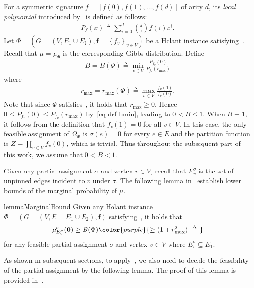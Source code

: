 \documentclass[11pt]{article}
\newcommand{\set}[1]{\left\{#1\right\}}
\newcommand{\defeq}{\triangleq} \renewcommand{\d}{\,\-d}
\newcommand{\zero}{\boldsymbol{0}}
\newcommand{\vecf}{\boldsymbol{f}}
\newcommand{\zdtodo}[1]{\todo[color = blue!40, size = \tiny]{\textbf{zhidan:} #1}}
\newcommand{\qgl}[1]{{\color{purple}{#1}}}
\begin{document}
For a symmetric signature $f = [f(0), f(1), \ldots, f(d)]$ of arity $d$, its \emph{local polynomial} introduced by~\cite{GLLZ21Holant} is defined as follows:
\begin{align} \label{eq:local-polynomial}
    P_f(x) \defeq \sum_{i = 0}^{d} \binom{d}{i} f(i) x^i.
\end{align}
Let $\Phi = \left(G = (V, E_1 \cup E_2), \vecf = \set{f_v}_{v \in V}\right)$ be a Holant instance satisfying~. Recall that $\mu = \mu_{\Phi}$ is the corresponding Gibbs distribution. Define 
\begin{align}\label{eq-def-bmin}
    B = B(\Phi) \defeq \min_{v \in V} \frac{P_{f_v}(0)}{P_{f_v}(r_{\max})}
\end{align}
where 
\begin{align}\label{eq-def-rmax}
    r_{\max} = r_{\max}(\Phi) \defeq \max_{v \in V} \frac{f_v(1)}{f_v(0)}.
\end{align}
Note that since $\Phi$ satisfies~, it holds that $r_{\max} \ge 0$. Hence $0 \le P_{f_v}(0) \le P_{f_v}(r_{\max})$ by~\eqref{eq-def-bmin}, leading to $0 < B \le 1$. When $B = 1$, it follows from the definition that $f_{v}(1) = 0$ for all $v \in V$. In this case, the only feasible assignment of $\Omega_{\Phi}$ is $\sigma(e) = 0$ for every $e \in E$ and the partition function is $Z = \prod_{v \in V} f_v(0)$, which is trivial. Thus throughout the subsequent part of this work, we assume that $0 < B < 1$.

Given any partial assignment $\sigma$ and vertex $v\in V$, recall that $E_v^\sigma$ is the set of unpinned edges incident to $v$ under $\sigma$. The following lemma in~\cite{CG24bMatching} establish lower bounds of the marginal probability of $\mu$.
\begin{restatable}{lemma}{MarginalBound} \label{lem:marginal-bound}
    Given any Holant instance $\Phi = \left(G=(V,E=E_1\cup E_2) , \vecf \right)$ satisfying~, it holds that
    \begin{align} \label{eq:marginal-bound}
        \mu_{E_v^\sigma}^{\sigma}(\zero) \ge B(\Phi) \qgl{\ge (1 + r_{\max}^2)^{-\Delta},}
    \end{align}
    for any feasible partial assignment $\sigma$ and vertex $v\in V$ where $E^{\sigma}_v\subseteq E_1$.
\end{restatable}
    As shown in subsequent sections, to apply~, we also need to decide the feasibility of the partial assignment by the following lemma. The proof of this lemma is provided in~.
\end{document}
